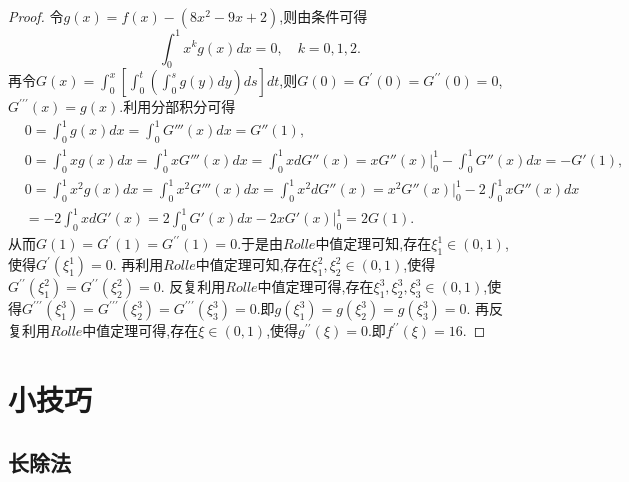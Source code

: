 \documentclass[lang=cn,newtx,10pt,scheme=chinese]{elegantbook}
\begin{document}
\begin{proof}
   令\(g(x)=f(x)-(8x^2 - 9x + 2)\),则由条件可得
\[
\int_0^1 x^k g(x)dx = 0, \quad k = 0,1,2.
\]
再令\(G(x)=\int_0^x\left[\int_0^t\left(\int_0^s g(y)dy\right)ds\right]dt\),则\(G(0)=G^\prime(0)=G^{\prime\prime}(0)=0\),\(G^{\prime\prime\prime}(x)=g(x)\).利用分部积分可得
\begin{align*}
   &0=\int_0^1{g\left( x \right) dx}=\int_0^1{G'''\left( x \right) dx}=G''\left( 1 \right) ,
   \\
   &0=\int_0^1{xg\left( x \right) dx}=\int_0^1{xG'''\left( x \right) dx}=\int_0^1{xdG''\left( x \right)}=xG''\left( x \right) \Big |_{0}^{1}-\int_0^1{G''\left( x \right) dx}=-G'\left( 1 \right) ,
   \\
   &0=\int_0^1{x^2g\left( x \right) dx}=\int_0^1{x^2G'''\left( x \right) dx}=\int_0^1{x^2dG''\left( x \right)}=x^2G''\left( x \right) \Big |_{0}^{1}-2\int_0^1{xG''\left( x \right) dx}
   \\
   &=-2\int_0^1{xdG'\left( x \right)}=2\int_0^1{G'\left( x \right) dx}-2xG'\left( x \right) \Big |_{0}^{1}=2G\left( 1 \right) .
\end{align*}
从而\(G(1)=G^\prime(1)=G^{\prime\prime}(1)=0\).于是由\(Rolle\)中值定理可知,存在\(\xi_1^1\in(0,1)\),使得\(G^\prime(\xi_1^1)=0\).
再利用\(Rolle\)中值定理可知,存在\(\xi_1^2,\xi_2^2\in(0,1)\),使得\(G^{\prime\prime}(\xi_1^2)=G^{\prime\prime}(\xi_2^2)=0\).
反复利用\(Rolle\)中值定理可得,存在\(\xi_1^3,\xi_2^3,\xi_3^3\in(0,1)\),使得\(G^{\prime\prime\prime}(\xi_1^3)=G^{\prime\prime\prime}(\xi_2^3)=G^{\prime\prime\prime}(\xi_3^3)=0\).即\(g(\xi_1^3)=g(\xi_2^3)=g(\xi_3^3)=0\).
再反复利用\(Rolle\)中值定理可得,存在\(\xi\in(0,1)\),使得\(g^{\prime\prime}(\xi)=0\).即\(f^{\prime\prime}(\xi)=16\).
\end{proof}

















\chapter{小技巧}

\section{长除法}
\end{document}
